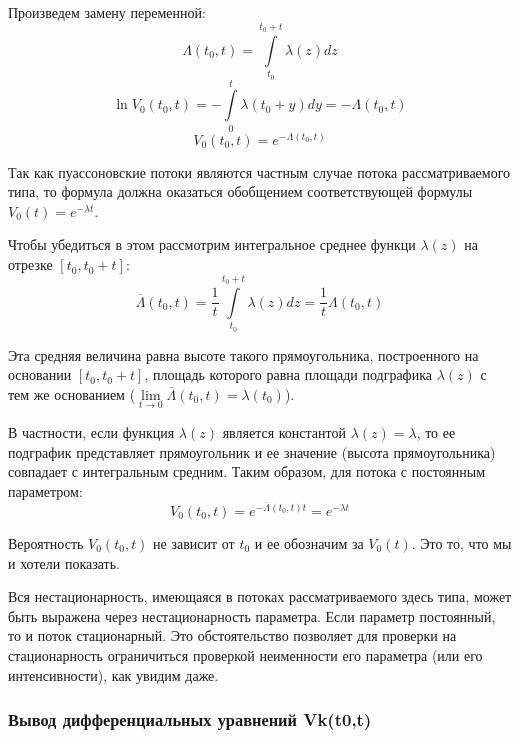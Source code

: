 \documentclass[aps,%
12pt,%
final,%
oneside,
onecolumn,%
musixtex, %
superscriptaddress,%
centertags]{article} %
\theoremstyle{plain}
\theoremstyle{definition}
\theoremstyle{remark}
\begin{document}
Произведем замену переменной:
$$\Lambda (t_0,t) = \int\limits_{t_0}^{t_0+t}\lambda(z)dz$$
$$\ln V_0(t_0,t) = -\int\limits_0^t \lambda(t_0+y)dy = - \Lambda (t_0,t)$$
$$V_0(t_0,t) = e^{- \Lambda (t_0,t)}$$

Так как пуассоновские потоки являются частным случае потока рассматриваемого типа, то формула должна оказаться обобщением соответствующей формулы $V_0(t) = e^{-\lambda t}$.

Чтобы убедиться в этом рассмотрим интегральное среднее функци $\lambda(z)$ на отрезке $[t_0,t_0+t]$:
$$\overline{\Lambda} (t_0,t) = \frac{1}{t}\int\limits_{t_0}^{t_0+t}\lambda(z)dz = \frac{1}{t}\Lambda(t_0,t)$$

Эта средняя величина равна высоте такого прямоугольника, построенного на основании $[t_0,t_0+t]$, площадь которого равна площади подграфика $\lambda(z)$ с тем же основанием ($\lim\limits_{t \to 0 } \overline{\Lambda}(t_0,t) = \lambda(t_0)$).

В частности, если функция $\lambda(z)$ является константой $\lambda(z) = \lambda$, то ее подграфик представляет прямоугольник и ее значение (высота прямоугольника) совпадает с интегральным средним. Таким образом, для потока с постоянным параметром:
$$V_0(t_0,t) = e^{- \overline{\Lambda} (t_0,t) t }  =  e^{-\lambda t}$$

Вероятность $V_0(t_0,t)$ не зависит от $t_0$ и ее обозначим за $V_0(t)$. Это то, что мы и хотели показать.

Вся нестационарность, имеющаяся в потоках рассматриваемого здесь типа, может быть выражена через нестационарность параметра. Если параметр постоянный, то и поток стационарный. Это обстоятельство позволяет для проверки на стационарность ограничиться проверкой неименности его параметра (или его интенсивности), как увидим даже.

\subsubsection{Вывод дифференциальных уравнений Vk(t0,t)}
\end{document}
